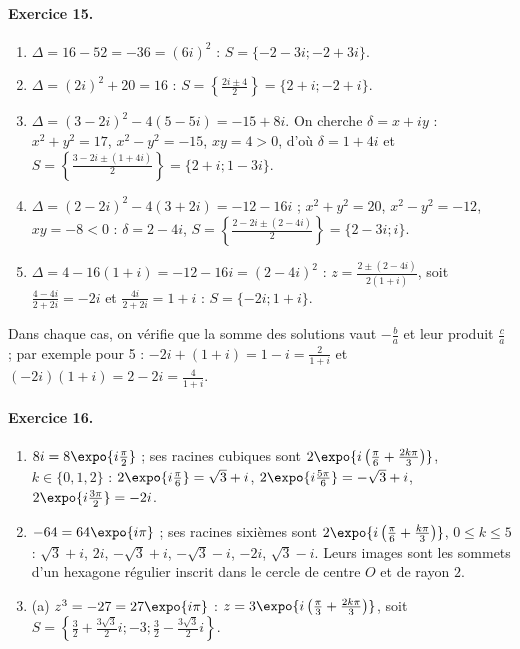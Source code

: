 \begin{corrige}
\paragraph{Exercice 15.}
\begin{enumerate}
\item $\Delta = 16 - 52 = -36 = (6i)^2$ : $S = \{-2 - 3i ; -2 + 3i\}$.
\item $\Delta = (2i)^2 + 20 = 16$ : $S = \left\{\frac{2i \pm 4}{2}\right\} = \{2 + i ; -2 + i\}$.
\item $\Delta = (3 - 2i)^2 - 4(5 - 5i) = -15 + 8i$. On cherche $\delta = x + iy$ : $x^2 + y^2 = 17$, $x^2 - y^2 = -15$, $xy = 4 > 0$,
      d'o\`u $\delta = 1 + 4i$ et $S = \left\{\frac{3 - 2i \pm (1 + 4i)}{2}\right\} = \{2 + i ; 1 - 3i\}$.
\item $\Delta = (2 - 2i)^2 - 4(3 + 2i) = -12 - 16i$ ; $x^2 + y^2 = 20$, $x^2 - y^2 = -12$, $xy = -8 < 0$ : $\delta = 2 - 4i$,
      $S = \left\{\frac{2 - 2i \pm (2 - 4i)}{2}\right\} = \{2 - 3i ; i\}$.
\item $\Delta = 4 - 16(1+i) = -12 - 16i = (2 - 4i)^2$ :
      $z = \frac{2 \pm (2 - 4i)}{2(1+i)}$, soit $\frac{4 - 4i}{2 + 2i} = -2i$ et $\frac{4i}{2 + 2i} = 1 + i$ : $S = \{-2i ; 1 + i\}$.
\end{enumerate}
Dans chaque cas, on v\'erifie que la somme des solutions vaut $-\frac{b}{a}$ et leur produit $\frac{c}{a}$ ;
par exemple pour 5 : $-2i + (1+i) = 1 - i = \frac{2}{1+i}$ et $(-2i)(1+i) = 2 - 2i = \frac{4}{1+i}$.

\paragraph{Exercice 16.}
\begin{enumerate}
\item $8i = 8\expo{i\frac{\pi}{2}}$ ; ses racines cubiques sont $2\expo{i\left(\frac{\pi}{6} + \frac{2k\pi}{3}\right)}$, $k \in \{0,1,2\}$ :
      $2\expo{i\frac{\pi}{6}} = \sqrt{3} + i$, $2\expo{i\frac{5\pi}{6}} = -\sqrt{3} + i$, $2\expo{i\frac{3\pi}{2}} = -2i$.
\item $-64 = 64\expo{i\pi}$ ; ses racines sixi\`emes sont $2\expo{i\left(\frac{\pi}{6} + \frac{k\pi}{3}\right)}$, $0 \leq k \leq 5$ :
      $\sqrt{3} + i$, $2i$, $-\sqrt{3} + i$, $-\sqrt{3} - i$, $-2i$, $\sqrt{3} - i$.
      Leurs images sont les sommets d'un hexagone r\'egulier inscrit dans le cercle de centre $O$ et de rayon $2$.
\item (a) $z^3 = -27 = 27\expo{i\pi}$ : $z = 3\expo{i\left(\frac{\pi}{3} + \frac{2k\pi}{3}\right)}$, soit
      $S = \left\{\frac{3}{2} + \frac{3\sqrt{3}}{2}i ; -3 ; \frac{3}{2} - \frac{3\sqrt{3}}{2}i\right\}$.


\end{enumerate}
\end{corrige}
